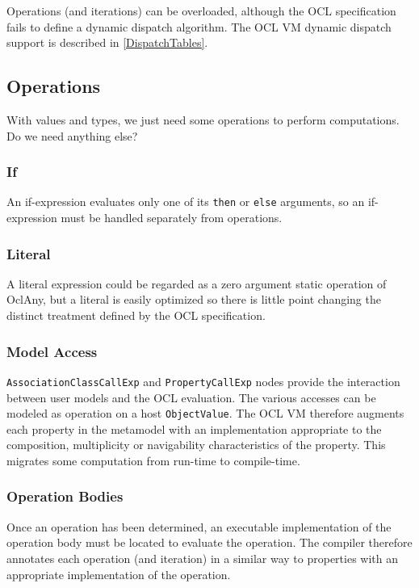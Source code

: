 \documentclass{sig-alternate}
\begin{document}
Operations (and iterations)  can be overloaded, although the OCL specification fails to define a dynamic dispatch algorithm. The OCL VM dynamic dispatch support is described in \ref{DispatchTables}.

\subsection{Operations}

With values and types, we just need some operations to perform computations. Do we need anything else?

\subsubsection{If}

An if-expression evaluates only one of its \verb|then| or \verb|else| arguments, so an if-expression must be handled separately from operations.

\subsubsection{Literal}

A literal expression could be regarded as a zero argument static operation of OclAny, but a literal is easily optimized so there is little point changing the distinct treatment defined by the OCL specification.

\subsubsection{Model Access}

\verb|AssociationClassCallExp| and \verb|PropertyCallExp| nodes provide the interaction between user models and the OCL evaluation. The various accesses can be modeled as operation on a host \verb|ObjectValue|. The OCL VM therefore augments each property in the metamodel with an implementation appropriate to the composition, multiplicity or navigability characteristics of the property. This migrates some computation from run-time to compile-time.

\subsubsection{Operation Bodies}

Once an operation has been determined, an executable implementation of the operation body must be located to evaluate the operation. The compiler therefore annotates each operation (and iteration) in a similar way to properties with an appropriate implementation of the operation.
\end{document}
